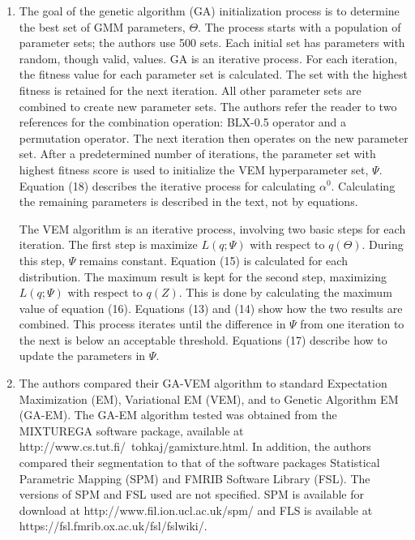 \documentclass[11pt]{article}
\begin{document}
\begin{enumerate}
    \item The goal of the genetic algorithm (GA) initialization process is to
        determine the best set of GMM parameters, \(\Theta\). The process starts
        with a population of parameter sets; the authors use 500 sets. Each
        initial set has parameters with random, though valid, values. GA is an
        iterative process. For each iteration, the fitness value for each
        parameter set is calculated. The set with the highest fitness is
        retained for the next iteration. All other parameter sets are combined
        to create new parameter sets. The authors refer the reader to two
        references for the combination operation: BLX-0.5 operator and a
        permutation operator. The next iteration then operates on the new
        parameter set. After a predetermined number of iterations, the parameter
        set with highest fitness score is used to initialize the VEM
        hyperparameter set, \(\Psi\). Equation (18) describes the iterative
        process for calculating \(\alpha^0\). Calculating the remaining
        parameters is described in the text, not by equations.

        The VEM algorithm is an iterative process, involving two basic steps
        for each iteration. The first step is maximize \(L(q;\Psi)\) with
        respect to \(q(\Theta)\). During this step, \(\Psi\) remains constant.
        Equation (15) is calculated for each distribution. The maximum result is
        kept for the second step, maximizing \(L(q;\Psi)\) with respect to
        \(q(Z)\). This is done by calculating the maximum value of equation
        (16). Equations (13) and (14) show how the two results are combined.
        This process iterates until the difference in \(\Psi\) from one
        iteration to the next is below an acceptable threshold. Equations (17)
        describe how to update the parameters in \(\Psi\).

    \item The authors compared their GA-VEM algorithm to standard Expectation
        Maximization (EM), Variational EM (VEM), and to Genetic Algorithm EM
        (GA-EM). The GA-EM algorithm tested was obtained from the MIXTUREGA
        software package, available at \\
        http://www.cs.tut.fi/~tohkaj/gamixture.html. In addition, the authors
        compared their segmentation to that of the software packages Statistical
        Parametric Mapping (SPM) and FMRIB Software Library (FSL). The versions
        of SPM and FSL used are not specified. SPM is available for download at
        http://www.fil.ion.ucl.ac.uk/spm/ and FLS is available at \\
        https://fsl.fmrib.ox.ac.uk/fsl/fslwiki/.


\end{enumerate}
\end{document}
